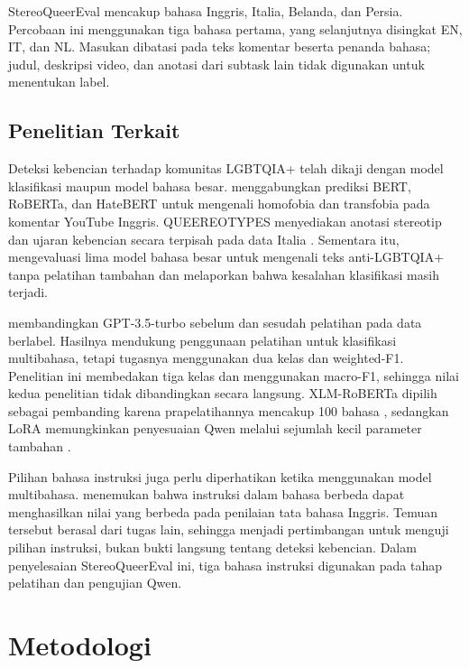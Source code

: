 \documentclass[11pt]{article}
\begin{document}
StereoQueerEval mencakup bahasa Inggris, Italia, Belanda, dan Persia. Percobaan ini menggunakan tiga bahasa pertama, yang selanjutnya disingkat EN, IT, dan NL. Masukan dibatasi pada teks komentar beserta penanda bahasa; judul, deskripsi video, dan anotasi dari subtask lain tidak digunakan untuk menentukan label.

\subsection{Penelitian Terkait}
Deteksi kebencian terhadap komunitas LGBTQIA+ telah dikaji dengan model klasifikasi maupun model bahasa besar. \citet{nozza-2022-nozza} menggabungkan prediksi BERT, RoBERTa, dan HateBERT untuk mengenali homofobia dan transfobia pada komentar YouTube Inggris. QUEEREOTYPES menyediakan anotasi stereotip dan ujaran kebencian secara terpisah pada data Italia \citep{cignarella-etal-2024-queereotypes}. Sementara itu, \citet{nguyen-etal-2025-leveraging} mengevaluasi lima model bahasa besar untuk mengenali teks anti-LGBTQIA+ tanpa pelatihan tambahan dan melaporkan bahwa kesalahan klasifikasi masih terjadi.

\citet{chan-etal-2024-hate} membandingkan GPT-3.5-turbo sebelum dan sesudah pelatihan pada data berlabel. Hasilnya mendukung penggunaan pelatihan untuk klasifikasi multibahasa, tetapi tugasnya menggunakan dua kelas dan weighted-F1. Penelitian ini membedakan tiga kelas dan menggunakan macro-F1, sehingga nilai kedua penelitian tidak dibandingkan secara langsung. XLM-RoBERTa dipilih sebagai pembanding karena prapelatihannya mencakup 100 bahasa \citep{conneau-etal-2020-unsupervised}, sedangkan LoRA memungkinkan penyesuaian Qwen melalui sejumlah kecil parameter tambahan \citep{hu-etal-2021-lora}.

Pilihan bahasa instruksi juga perlu diperhatikan ketika menggunakan model multibahasa. \citet{behzad-etal-2024-ask} menemukan bahwa instruksi dalam bahasa berbeda dapat menghasilkan nilai yang berbeda pada penilaian tata bahasa Inggris. Temuan tersebut berasal dari tugas lain, sehingga menjadi pertimbangan untuk menguji pilihan instruksi, bukan bukti langsung tentang deteksi kebencian. Dalam penyelesaian StereoQueerEval ini, tiga bahasa instruksi digunakan pada tahap pelatihan dan pengujian Qwen.

\section{Metodologi}
\end{document}
